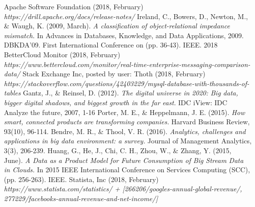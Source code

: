 \documentclass[a4paper,english]{report}
\begin{document}
\begin{thebibliography}{1}
		Apache Software Foundation (2018, February) 	\emph{https://drill.apache.org/docs/release-notes/}
		Ireland, C., Bowers, D., Newton, M., \& Waugh, K. (2009, March). \emph{A classification of object-relational impedance mismatch.} In Advances in Databases, Knowledge, and Data Applications, 2009. DBKDA'09. First International Conference on (pp. 36-43). IEEE.
		2018 BetterCloud Monitor (2018, February)
		\emph{https://www.bettercloud.com/monitor/real-time-enterprise-messaging-comparison-data/}
		Stack Exchange Inc, posted by user: Thoth (2018, February) \emph{https://stackoverflow.com/questions/42403229/mysql-database-with-thousands-of-tables}
		Gantz, J., \& Reinsel, D. (2012). \emph{The digital universe in 2020: Big data, bigger digital shadows, and biggest growth in the far east.} IDC iView: IDC Analyze the future, 2007, 1-16
		Porter, M. E., \& Heppelmann, J. E. (2015). \emph{How smart, connected products are transforming companies.} Harvard Business Review, 93(10), 96-114.
		Bendre, M. R., \& Thool, V. R. (2016). \emph{Analytics, challenges and applications in big data environment: a survey.} Journal of Management Analytics, 3(3), 206-239.
		Huang, G., He, J., Chi, C. H., Zhou, W., \& Zhang, Y. (2015, June). \emph{A Data as a Product Model for Future Consumption of Big Stream Data in	Clouds.} In 2015 IEEE International Conference on Services Computing (SCC), (pp. 256-263). IEEE.
		Statista, Inc (2018, February) \emph{https://www.statista.com/statistics/ + [266206/googles-annual-global-revenue/, 277229/facebooks-annual-revenue-and-net-income/]}
	\end{thebibliography}
\end{document}
